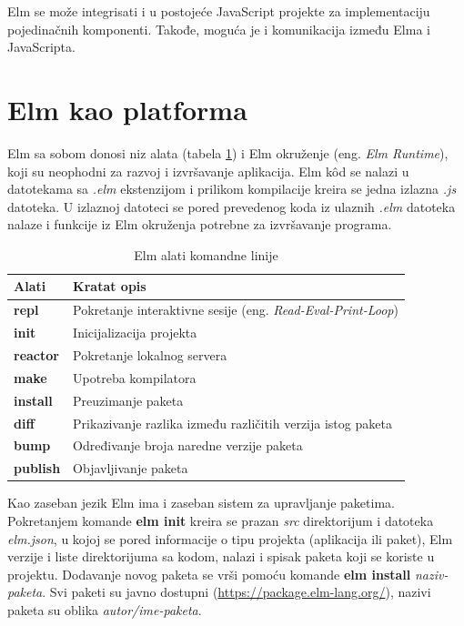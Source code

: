 \documentclass[12pt,oneside]{memoir}
\begin{document}
Elm se može integrisati i u postojeće JavaScript projekte za implementaciju pojedinačnih 
komponenti. Takođe, moguća je i komunikacija između Elma i JavaScripta. 

\section{Elm kao platforma}
Elm sa sobom donosi niz alata (tabela \ref{table:1}) i Elm okruženje (eng. \emph{Elm 
Runtime}), koji su neophodni za razvoj i izvršavanje aplikacija. Elm k\^{o}d se nalazi u 
datotekama sa \emph{.elm} ekstenzijom i prilikom kompilacije kreira se jedna izlazna 
\emph{.js} datoteka. U izlaznoj datoteci se pored prevedenog koda iz ulaznih \emph{.elm} 
datoteka nalaze i funkcije iz Elm okruženja potrebne za izvršavanje programa.

\begin{table}[h!]
\centering
\begin{tabular}{|l l|} 
 \hline 
 Alati & Kratat opis  \\ [0.5ex] 
 \hline
  \textbf{repl} & Pokretanje interaktivne sesije (eng. \emph{Read-Eval-Print-Loop}) \\ 
  \textbf{init} & Inicijalizacija projekta \\
  \textbf{reactor} & Pokretanje lokalnog servera \\
  \textbf{make} & Upotreba kompilatora \\
  \textbf{install}  & Preuzimanje paketa \\ 
  \textbf{diff} & Prikazivanje razlika između različitih verzija istog paketa \\
  \textbf{bump} & Određivanje broja naredne verzije paketa  \\
  \textbf{publish} & Objavljivanje paketa \\[1ex] 
 \hline
\end{tabular}
\caption{Elm alati komandne linije}
\label{table:1}
\end{table}

 
Kao zaseban jezik Elm ima i zaseban sistem za upravljanje paketima.
Pokretanjem komande \textbf{elm init} kreira se prazan \emph{src} direktorijum i 
datoteka \emph{elm.json}, u kojoj se pored informacije o tipu projekta (aplikacija ili 
paket), Elm verzije i liste direktorijuma sa kodom, nalazi i spisak paketa koji se 
koriste u projektu. Dodavanje novog paketa se vrši pomoću komande \textbf{elm install} 
\emph{naziv-paketa}. Svi paketi su javno dostupni (\url{https://package.elm-lang.org/}),
nazivi paketa su oblika \emph{autor/ime-paketa}.
\end{document}
